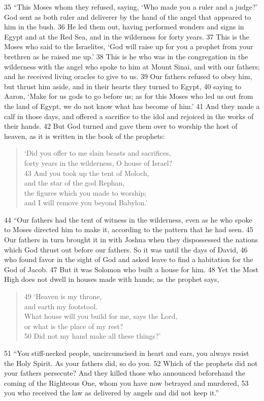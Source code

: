 \documentclass[letterpaper]{report}
\begin{document}
\begin{multicols}{2}
35 “This Moses whom they refused, saying, ‘Who made you a ruler and a judge?’ God sent as both ruler and deliverer by the hand of the angel that appeared to him in the bush. 36 He led them out, having performed wonders and signs in Egypt and at the Red Sea, and in the wilderness for forty years. 37 This is the Moses who said to the Israelites, ‘God will raise up for you a prophet from your brethren as he raised me up.’ 38 This is he who was in the congregation in the wilderness with the angel who spoke to him at Mount Sinai, and with our fathers; and he received living oracles to give to us. 39 Our fathers refused to obey him, but thrust him aside, and in their hearts they turned to Egypt, 40 saying to Aaron, ‘Make for us gods to go before us; as for this Moses who led us out from the land of Egypt, we do not know what has become of him.’ 41 And they made a calf in those days, and offered a sacrifice to the idol and rejoiced in the works of their hands. 42 But God turned and gave them over to worship the host of heaven, as it is written in the book of the prophets:

\begin{verse}
‘Did you offer to me slain beasts and sacrifices,\\
forty years in the wilderness, O house of Israel?\\
43 And you took up the tent of Moloch,\\
and the star of the god Rephan,\\
the figures which you made to worship;\\
and I will remove you beyond Babylon.’\\
\end{verse}

44 “Our fathers had the tent of witness in the wilderness, even as he who spoke to Moses directed him to make it, according to the pattern that he had seen. 45 Our fathers in turn brought it in with Joshua when they dispossessed the nations which God thrust out before our fathers. So it was until the days of David, 46 who found favor in the sight of God and asked leave to find a habitation for the God of Jacob. 47 But it was Solomon who built a house for him. 48 Yet the Most High does not dwell in houses made with hands; as the prophet says,

\begin{verse}
49 ‘Heaven is my throne,\\
and earth my footstool.\\
What house will you build for me, says the Lord,\\
or what is the place of my rest?\\
50 Did not my hand make all these things?’\\
\end{verse}
51 “You stiff-necked people, uncircumcised in heart and ears, you always resist the Holy Spirit. As your fathers did, so do you. 52 Which of the prophets did not your fathers persecute? And they killed those who announced beforehand the coming of the Righteous One, whom you have now betrayed and murdered, 53 you who received the law as delivered by angels and did not keep it.”


\end{multicols}
\end{document}
